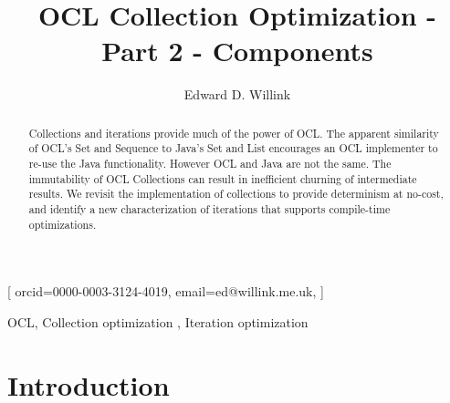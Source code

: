 \documentclass[
]{ceurart}
\begin{document}


\title{OCL Collection Optimization - Part 2 - Components}

\author[1,2]{Edward D. Willink}[%
orcid=0000-0003-3124-4019,
email=ed@willink.me.uk,
]
\cormark[1]
\fnmark[1]
\address[1]{Willink Transformations Ltd, Reading England}
\address[2]{Eclipse Foundation}



\begin{abstract}
Collections and iterations provide much of the power of OCL. The apparent similarity of OCL's Set and Sequence to Java's Set and List encourages an OCL implementer to re-use the Java functionality. However OCL and Java are not the same. The immutability of OCL Collections can result in inefficient churning of intermediate results. We revisit the implementation of collections to provide determinism at no-cost, and identify a new characterization of iterations that supports compile-time optimizations.
\end{abstract}

\begin{keywords}
  OCL\sep
  Collection optimization \sep
  Iteration optimization
\end{keywords}

\maketitle

\section{Introduction}
\end{document}
